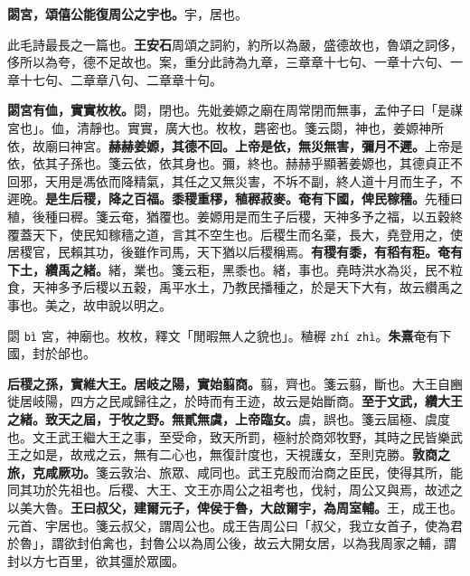 
\textbf{閟宮，頌僖公能復周公之宇也。}{\footnotesize 宇，居也。}

\begin{quoting}此毛詩最長之一篇也。\textbf{王安石}周頌之詞約，約所以為嚴，盛德故也，魯頌之詞侈，侈所以為夸，德不足故也。案，重分此詩為九章，三章章十七句、一章十六句、一章十七句、二章章八句、二章章十句。\end{quoting}

\textbf{閟宮有侐，實實枚枚。}{\footnotesize 閟，閉也。先妣姜嫄之廟在周常閉而無事，孟仲子曰「是禖宮也」。侐，清靜也。實實，廣大也。枚枚，礱密也。箋云閟，神也，姜嫄神所依，故廟曰神宮。}\textbf{赫赫姜嫄，其德不回。上帝是依，無災無害，彌月不遲。}{\footnotesize 上帝是依，依其子孫也。箋云依，依其身也。彌，終也。赫赫乎顯著姜嫄也，其德貞正不回邪，天用是馮依而降精氣，其任之又無災害，不坼不副，終人道十月而生子，不遲晚。}\textbf{是生后稷，降之百福。黍稷重穋，稙稺菽麥。奄有下國，俾民稼穡。}{\footnotesize 先種曰稙，後種曰稺。箋云奄，猶覆也。姜嫄用是而生子后稷，天神多予之福，以五穀終覆蓋天下，使民知稼穡之道，言其不空生也。后稷生而名棄，長大，堯登用之，使居稷官，民賴其功，後雖作司馬，天下猶以后稷稱焉。}\textbf{有稷有黍，有稻有秬。奄有下土，纘禹之緒。}{\footnotesize 緒，業也。箋云秬，黑黍也。緒，事也。堯時洪水為災，民不粒食，天神多予后稷以五穀，禹平水土，乃教民播種之，於是天下大有，故云纘禹之事也。美之，故申說以明之。}

\begin{quoting}閟 \texttt{bì} 宮，神廟也。枚枚，釋文「閒暇無人之貌也」。稙稺 \texttt{zhí zhì}。\textbf{朱熹}奄有下國，封於邰也。\end{quoting}

\textbf{后稷之孫，實維大王。居岐之陽，實始翦商。}{\footnotesize 翦，齊也。箋云翦，斷也。大王自豳徙居岐陽，四方之民咸歸往之，於時而有王迹，故云是始斷商。}\textbf{至于文武，纘大王之緒。致天之屆，于牧之野。無貳無虞，上帝臨女。}{\footnotesize 虞，誤也。箋云屆極、虞度也。文王武王繼大王之事，至受命，致天所罰，極紂於商郊牧野，其時之民皆樂武王之如是，故戒之云，無有二心也，無復計度也，天視護女，至則克勝。}\textbf{敦商之旅，克咸厥功。}{\footnotesize 箋云敦治、旅眾、咸同也。武王克殷而治商之臣民，使得其所，能同其功於先祖也。后稷、大王、文王亦周公之祖考也，伐紂，周公又與焉，故述之以美大魯。}\textbf{王曰叔父，建爾元子，俾侯于魯，大啟爾宇，為周室輔。}{\footnotesize 王，成王也。元首、宇居也。箋云叔父，謂周公也。成王告周公曰「叔父，我立女首子，使為君於魯」，謂欲封伯禽也，封魯公以為周公後，故云大開女居，以為我周家之輔，謂封以方七百里，欲其彊於眾國。}


